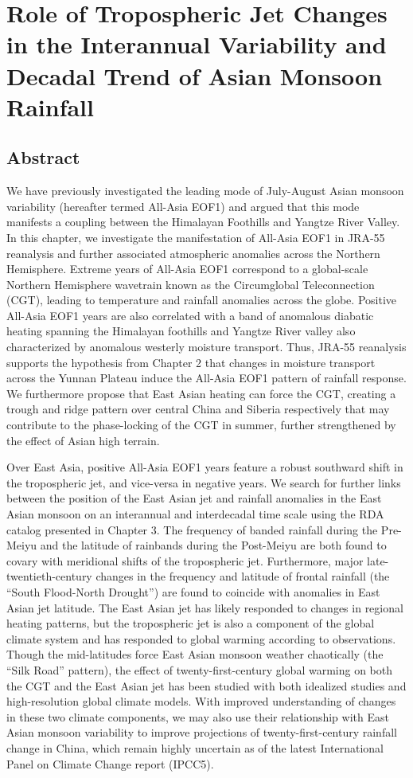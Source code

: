 \chapter{Role of Tropospheric Jet Changes in the Interannual Variability and Decadal Trend of Asian Monsoon Rainfall}

\section{Abstract}
We have previously investigated the leading mode of July-August Asian monsoon variability (hereafter termed All-Asia EOF1) and argued that this mode manifests a coupling between the Himalayan Foothills and Yangtze River Valley. In this chapter, we investigate the manifestation of All-Asia EOF1 in JRA-55 reanalysis and further associated atmospheric anomalies across the Northern Hemisphere. Extreme years of All-Asia EOF1 correspond to a global-scale Northern Hemisphere wavetrain known as the Circumglobal Teleconnection (CGT), leading to temperature and rainfall anomalies across the globe. Positive All-Asia EOF1 years are also correlated with a band of anomalous diabatic heating spanning the Himalayan foothills and Yangtze River valley also characterized by anomalous westerly moisture transport. Thus, JRA-55 reanalysis supports the hypothesis from Chapter 2 that changes in moisture transport across the Yunnan Plateau induce the All-Asia EOF1 pattern of rainfall response. We furthermore propose that East Asian heating can force the CGT, creating a trough and ridge pattern over central China and Siberia respectively that may contribute to the phase-locking of the CGT in summer, further strengthened by the effect of Asian high terrain.

Over East Asia, positive All-Asia EOF1 years feature a robust southward shift in the tropospheric jet, and vice-versa in negative years. We search for further links between the position of the East Asian jet and rainfall anomalies in the East Asian monsoon on an interannual and interdecadal time scale using the RDA catalog presented in Chapter 3. The frequency of banded rainfall during the Pre-Meiyu and the latitude of rainbands during the Post-Meiyu are both found to covary with meridional shifts of the tropospheric jet. Furthermore, major late-twentieth-century changes in the frequency and latitude of frontal rainfall (the ``South Flood-North Drought'') are found to coincide with anomalies in East Asian jet latitude. The East Asian jet has likely responded to changes in regional heating patterns, but the tropospheric jet is also a component of the global climate system and has responded to global warming according to observations. Though the mid-latitudes force East Asian monsoon weather chaotically (the ``Silk Road'' pattern), the effect of twenty-first-century global warming on both the CGT and the East Asian jet has been studied with both idealized studies and high-resolution global climate models. With improved understanding of changes in these two climate components, we may also use their relationship with East Asian monsoon variability to improve projections of twenty-first-century rainfall change in China, which remain highly uncertain as of the latest International Panel on Climate Change report (IPCC5).


